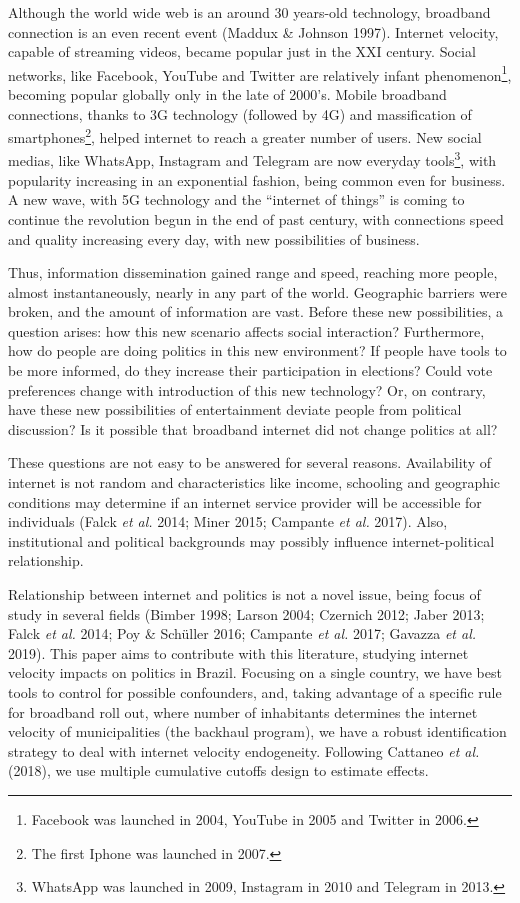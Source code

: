 \documentclass[
  12pt,
]{article}
\begin{document}
Although the world wide web is an around 30 years-old technology,
broadband connection is an even recent event (Maddux \& Johnson 1997).
Internet velocity, capable of streaming videos, became popular just in
the XXI century. Social networks, like Facebook, YouTube and Twitter are
relatively infant phenomenon\footnote{Facebook was launched in 2004,
  YouTube in 2005 and Twitter in 2006.}, becoming popular globally only
in the late of 2000's. Mobile broadband connections, thanks to 3G
technology (followed by 4G) and massification of smartphones\footnote{The
  first Iphone was launched in 2007.}, helped internet to reach a
greater number of users. New social medias, like WhatsApp, Instagram and
Telegram are now everyday tools\footnote{WhatsApp was launched in 2009,
  Instagram in 2010 and Telegram in 2013.}, with popularity increasing
in an exponential fashion, being common even for business. A new wave,
with 5G technology and the ``internet of things'' is coming to continue
the revolution begun in the end of past century, with connections speed
and quality increasing every day, with new possibilities of business.

Thus, information dissemination gained range and speed, reaching more
people, almost instantaneously, nearly in any part of the world.
Geographic barriers were broken, and the amount of information are vast.
Before these new possibilities, a question arises: how this new scenario
affects social interaction? Furthermore, how do people are doing
politics in this new environment? If people have tools to be more
informed, do they increase their participation in elections? Could vote
preferences change with introduction of this new technology? Or, on
contrary, have these new possibilities of entertainment deviate people
from political discussion? Is it possible that broadband internet did
not change politics at all?

These questions are not easy to be answered for several reasons.
Availability of internet is not random and characteristics like income,
schooling and geographic conditions may determine if an internet service
provider will be accessible for individuals (Falck \emph{et al.} 2014;
Miner 2015; Campante \emph{et al.} 2017). Also, institutional and
political backgrounds may possibly influence internet-political
relationship.

Relationship between internet and politics is not a novel issue, being
focus of study in several fields (Bimber 1998; Larson 2004; Czernich
2012; Jaber 2013; Falck \emph{et al.} 2014; Poy \& Schüller 2016;
Campante \emph{et al.} 2017; Gavazza \emph{et al.} 2019). This paper
aims to contribute with this literature, studying internet velocity
impacts on politics in Brazil. Focusing on a single country, we have
best tools to control for possible confounders, and, taking advantage of
a specific rule for broadband roll out, where number of inhabitants
determines the internet velocity of municipalities (the backhaul
program), we have a robust identification strategy to deal with internet
velocity endogeneity. Following Cattaneo \emph{et al.} (2018), we use
multiple cumulative cutoffs design to estimate effects.
\end{document}
